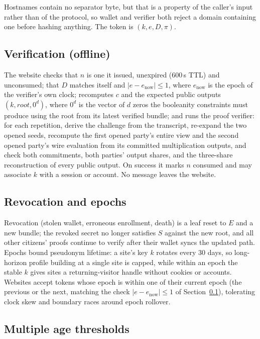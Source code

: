 \documentclass[11pt]{article}
\theoremstyle{definition}
\begin{document}
\noindent
Hostnames contain no separator byte, but that is a property of the caller's input rather
than of the protocol, so wallet and verifier both reject a domain containing one before
hashing anything. The token is $(k, e, D, \pi)$.

\subsection{Verification (offline)}
\label{sec:verification}

The website checks that $n$ is one it issued, unexpired (600\,s TTL) and unconsumed; that
$D$ matches itself and $|e - e_{\mathrm{now}}| \le 1$, where $e_{\mathrm{now}}$ is the
epoch of the verifier's own clock; recomputes $c$ and the expected public outputs $(k,
\mathit{root}, 0^d)$, where $0^d$ is the vector of $d$ zeros the booleanity constraints
must produce using the root from its latest verified bundle;
and runs the proof verifier: for each repetition, derive the challenge from the
transcript, re-expand the two opened seeds, recompute the first opened party's entire view
and the second opened party's wire evaluation from its committed multiplication outputs,
and check both commitments, both parties' output shares, and the three-share
reconstruction of every public output. On success it marks $n$ consumed and may associate
$k$ with a session or account. No message leaves the website.

\subsection{Revocation and epochs}

Revocation (stolen wallet, erroneous enrollment, death) is a leaf reset to $E$ and a new
bundle; the revoked secret no longer satisfies $S$ against the new root, and all other
citizens' proofs continue to verify after their wallet syncs the updated path. Epochs
bound pseudonym lifetime: a site's key $k$ rotates every 30 days, so long-horizon profile
building at a single site is capped, while within an epoch the stable $k$ gives sites a
returning-visitor handle without cookies or accounts. Websites accept tokens whose epoch
is within one of their current epoch (the previous or the next, matching the check $|e -
e_{\mathrm{now}}| \le 1$ of Section~\ref{sec:verification}), tolerating clock skew and
boundary races around epoch rollover.

\subsection{Multiple age thresholds}
\label{sec:thresholds}
\end{document}
